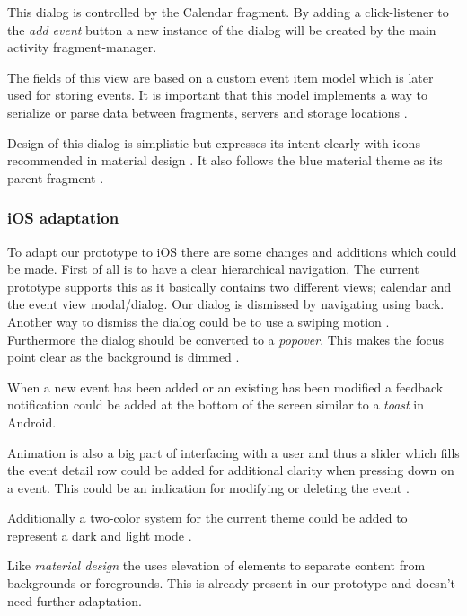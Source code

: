 \documentclass[]{article}
\begin{document}
\begin{flushleft}
This dialog is controlled by the Calendar fragment. By adding a click-listener to the \textit{add event} button a new instance of the dialog will be created by the main activity fragment-manager.\medskip

The fields of this view are based on a custom event item model which is later used for storing events. It is important that this model implements a way to serialize or parse data between fragments, servers and storage locations \parencite{parcel}.\medskip

Design of this dialog is simplistic but expresses its intent clearly with icons\\ recommended in material design \parencite{icons:1}. It also follows the blue material theme as its parent fragment \parencite{button:1}.


\left\subsubsection{iOS adaptation}

To adapt our prototype to iOS there are some changes and additions which could be made.
First of all is to have a clear hierarchical navigation. The current prototype supports this as it basically contains two different views; calendar and the event view modal/dialog. Our dialog is dismissed by navigating using back. Another way to dismiss the dialog could be to use a swiping motion \parencite{modality}.
Furthermore the dialog should be converted to a \textit{popover}. This makes the focus point clear as the background is dimmed \parencite{popover}.
\medskip

When a new event has been added or an existing has been modified a feedback notification could be added at the bottom of the screen similar to a \textit{toast} in Android\parencite{feedback}.\medskip

Animation is also a big part of interfacing with a user and thus a slider which fills the event detail row could be added for additional clarity when pressing down on a event. This could be an indication for modifying or deleting the event \parencite{animation}.\medskip

Additionally a two-color system for the current theme could be added to represent a dark and light mode \parencite{color}.\medskip

Like \textit{material design} the \cite{elevation} uses elevation of elements to separate content from backgrounds or foregrounds. This is already present in our prototype and doesn't need further adaptation.


\end{flushleft}
\end{document}
